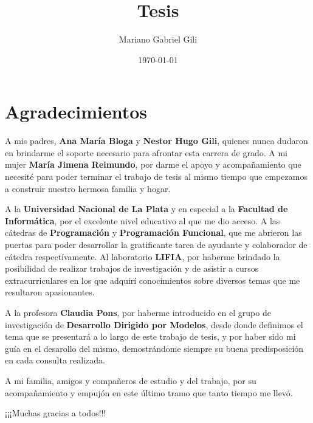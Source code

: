 \documentclass[a4paper,12pt,oneside,spanish]{book}
\author{Mariano Gabriel Gili}
\title{Tesis}
\date{\today}
\begin{document}
\maketitle

\frontmatter
\tableofcontents
\listoffigures


\chapter{Agradecimientos}


A mis padres, \textbf{Ana María Bloga} y \textbf{Nestor Hugo Gili}, quienes nunca dudaron en brindarme el soporte necesario para afrontar esta carrera de grado. A mi mujer \textbf{María Jimena Reimundo}, por darme el apoyo y acompañamiento que necesité para poder terminar el trabajo de tesis al mismo tiempo que empezamos a construir nuestro hermosa familia y hogar.

\bigskip

A la \textbf{Universidad Nacional de La Plata} y en especial a la \textbf{Facultad de Informática}, por el excelente nivel educativo al que me dio acceso. A las cátedras de \textbf{Programación} y \textbf{Programación Funcional}, que me abrieron las puertas para poder desarrollar la gratificante tarea de ayudante y colaborador de cátedra respectívamente. Al laboratorio \textbf{LIFIA}, por haberme brindado la posibilidad de realizar trabajos de investigación y de asistir a cursos extracurriculares en los que adquirí conocimientos sobre diversos temas que me resultaron apasionantes.

\bigskip

A la profesora \textbf{Claudia Pons}, por haberme introducido en el grupo de investigación de \textbf{Desarrollo Dirigido por Modelos}, desde donde definimos el tema que se presentará a lo largo de este trabajo de tesis, y por  haber sido mi guía en el desarollo del mismo, demostrándome siempre su buena predisposición en cada consulta realizada.

\bigskip

A mi familia, amigos y compañeros de estudio y del trabajo, por su acompañamiento y empujón en este último tramo que tanto tiempo me llevó.

\bigskip

¡¡¡Muchas gracias a todos!!!
\end{document}
